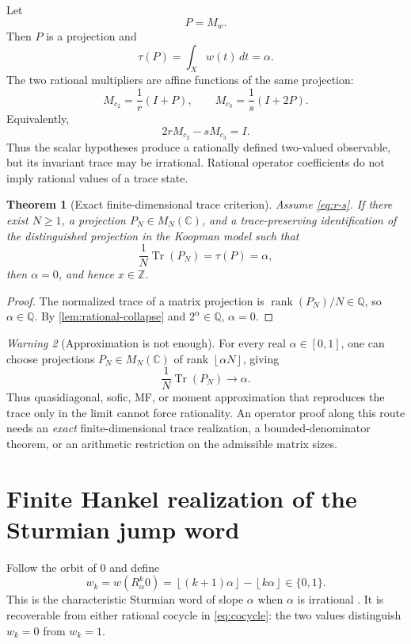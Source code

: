 \documentclass[11pt,oneside]{article}
\newtheorem{theorem}{Theorem}[section]
\theoremstyle{definition}
\theoremstyle{remark}
\newtheorem{warning}[theorem]{Warning}
\newcommand{\Z}{\mathbb Z}
\newcommand{\Q}{\mathbb Q}
\newcommand{\C}{\mathbb C}
\newcommand{\Tr}{\operatorname{Tr}}
\newcommand{\rank}{\operatorname{rank}}
\newcommand{\floor}[1]{\left\lfloor #1\right\rfloor}
\begin{document}
Let
\[
        P=M_w.
\]
Then \(P\) is a projection and
\begin{equation}\label{eq:trace-alpha}
        \tau(P)=\int_Xw(t)\,dt=\alpha.
\end{equation}
The two rational multipliers are affine functions of the same
projection:
\begin{equation}\label{eq:weights-projection}
        M_{c_2}=\frac1r(I+P),\qquad
        M_{c_3}=\frac1s(I+2P).
\end{equation}
Equivalently,
\[
        2rM_{c_2}-sM_{c_3}=I.
\]
Thus the scalar hypotheses produce a rationally defined two-valued
observable, but its invariant trace may be irrational.  Rational
operator coefficients do not imply rational values of a trace state.

\begin{theorem}[Exact finite-dimensional trace criterion]
\label{thm:finite-trace}
Assume \eqref{eq:r-s}.  If there exist \(N\geq1\), a projection
\(P_N\in M_N(\C)\), and a trace-preserving identification of the
distinguished projection in the Koopman model such that
\[
        \frac1N\Tr(P_N)=\tau(P)=\alpha,
\]
then \(\alpha=0\), and hence \(x\in\Z\).
\end{theorem}

\begin{proof}
The normalized trace of a matrix projection is
\(\rank(P_N)/N\in\Q\), so \(\alpha\in\Q\).  By
\cref{lem:rational-collapse} and \(2^\alpha\in\Q\),
\(\alpha=0\).
\end{proof}

\begin{warning}[Approximation is not enough]
For every real \(\alpha\in[0,1]\), one can choose projections
\(P_N\in M_N(\C)\) of rank \(\floor{\alpha N}\), giving
\[
        \frac1N\Tr(P_N)\longrightarrow\alpha.
\]
Thus quasidiagonal, sofic, MF, or moment approximation that reproduces
the trace only in the limit cannot force rationality.  An operator proof
along this route needs an \emph{exact} finite-dimensional trace
realization, a bounded-denominator theorem, or an arithmetic restriction
on the admissible matrix sizes.
\end{warning}

\section{Finite Hankel realization of the Sturmian jump word}

Follow the orbit of \(0\) and define
\begin{equation}\label{eq:sturmian-word}
        w_k=w(R_\alpha^k0)
            =\floor{(k+1)\alpha}-\floor{k\alpha}
            \in\{0,1\}.
\end{equation}
This is the characteristic Sturmian word of slope \(\alpha\) when
\(\alpha\) is irrational \cite{Lothaire,Queffelec}.  It is recoverable from either rational
cocycle in \eqref{eq:cocycle}: the two values distinguish \(w_k=0\)
from \(w_k=1\).
\end{document}
